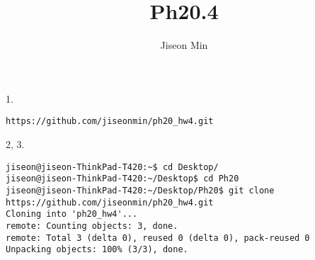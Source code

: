 \documentclass[10pt]{article}
\begin{document}
\pagestyle{fancy}
\cfoot{\thepage/\pageref{LastPage}}
\title{Ph20.4}
\author{Jiseon Min}
\maketitle
\section{}
1.
\newline
\begin{lstlisting}
https://github.com/jiseonmin/ph20_hw4.git
\end{lstlisting}

2, 3.
\newline
\begin{lstlisting}
jiseon@jiseon-ThinkPad-T420:~$ cd Desktop/
jiseon@jiseon-ThinkPad-T420:~/Desktop$ cd Ph20
jiseon@jiseon-ThinkPad-T420:~/Desktop/Ph20$ git clone https://github.com/jiseonmin/ph20_hw4.git
Cloning into 'ph20_hw4'...
remote: Counting objects: 3, done.
remote: Total 3 (delta 0), reused 0 (delta 0), pack-reused 0
Unpacking objects: 100% (3/3), done.
\end{lstlisting}
\end{document}

